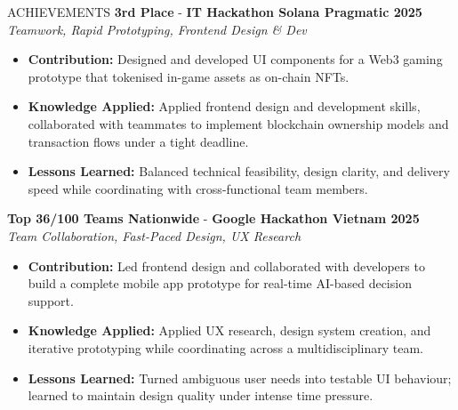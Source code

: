 \documentclass{resume}
\begin{document}
\begin{rSection}{ACHIEVEMENTS}
    \itemsep -3pt {}
    \textbf{3rd Place} - \textbf{IT Hackathon Solana Pragmatic 2025}\\
    {\small \textit{Teamwork, Rapid Prototyping, Frontend Design \& Dev}}
    \begin{itemize}
        \itemsep -4.5pt {}
        \item \textbf{Contribution:} Designed and developed UI components for a Web3 gaming prototype that tokenised in-game assets as on-chain NFTs.
        \item \textbf{Knowledge Applied:} Applied frontend design and development skills, collaborated with teammates to implement blockchain ownership models and transaction flows under a tight deadline.
        \item \textbf{Lessons Learned:} Balanced technical feasibility, design clarity, and delivery speed while coordinating with cross-functional team members.
    \end{itemize}
    \textbf{Top 36/100 Teams Nationwide} - \textbf{Google Hackathon Vietnam 2025}\\
    {\small \textit{Team Collaboration, Fast-Paced Design, UX Research}}
    \begin{itemize}
        \itemsep -4.5pt {}
        \item \textbf{Contribution:} Led frontend design and collaborated with developers to build a complete mobile app prototype for real-time AI-based decision support.
        \item \textbf{Knowledge Applied:} Applied UX research, design system creation, and iterative prototyping while coordinating across a multidisciplinary team.
        \item \textbf{Lessons Learned:} Turned ambiguous user needs into testable UI behaviour; learned to maintain design quality under intense time pressure.
    \end{itemize}
\end{rSection}
\end{document}

